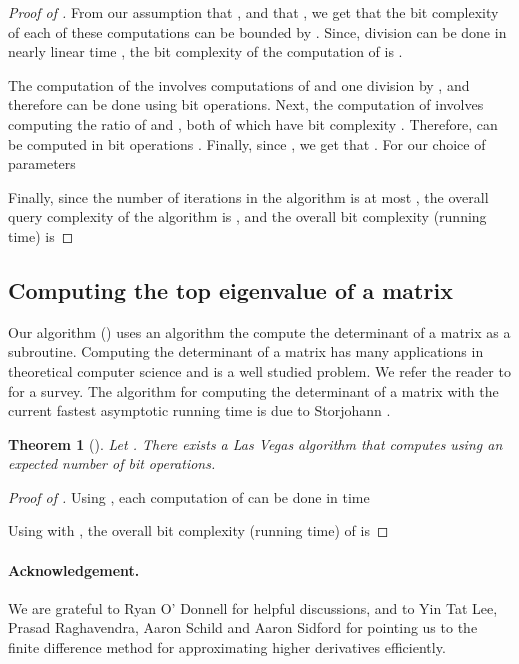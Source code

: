 \documentclass{article}[12pt]
\newtheorem{theorem}{Theorem}[section]
\theoremstyle{definition}
\begin{document}
\begin{proof}[Proof of ]
From our assumption that , 
and that , 
we get that 
the bit complexity of each of these  computations can be bounded by
.
Since, division can be done in nearly linear time \cite{ss71},
the bit complexity of the computation of  is 
.

The computation of the  involves  computations of  and
one division by ,
and therefore can be done using  bit operations.
Next, the computation of  involves computing the ratio of  and ,  
both of which have bit complexity . 
Therefore,  can be computed in 
bit operations \cite{ss71}.
Finally, since , we get that 
.
For our choice of parameters


Finally, since the number of iterations in the algorithm is at most ,
the overall query complexity of the algorithm is , 
and the overall bit complexity (running time) is 

\end{proof}






\subsection{Computing the top eigenvalue of a matrix}
\label{sec:matrix}

Our algorithm () uses an algorithm the compute the determinant of a matrix as a
subroutine.
Computing the determinant of a matrix has many applications in theoretical computer science
and is a well studied problem. We refer the reader to \cite{kv04} for a survey.
The algorithm for computing the determinant of a matrix with the current fastest asymptotic running time 
is due to Storjohann \cite{s05}.
\begin{theorem}[\cite{s05}]
\label{thm:fast-determinant}
Let . There exists a Las Vegas algorithm that computes 
using an expected number of  bit operations.
\end{theorem}

\begin{proof}[Proof of ]
Using , each computation of  can be done in time  

Using  with , the overall bit complexity (running time) of  is 

\end{proof}

\paragraph{Acknowledgement.} We are grateful to Ryan O' Donnell for helpful discussions, 
and to Yin Tat Lee, Prasad Raghavendra, Aaron Schild and Aaron Sidford for pointing us to the 
finite difference method for approximating higher derivatives efficiently. 



\end{document}
